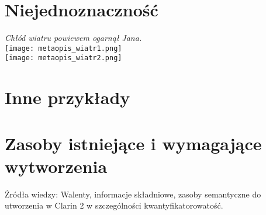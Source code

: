 \documentclass[a4paper,12pt]{article}
\begin{document}
\section{Niejednoznaczność}
\begin{center}
{\it Chłód wiatru powiewem ogarnął Jana.}\\
\texttt{[image: metaopis\_wiatr1.png]}\\
\texttt{[image: metaopis\_wiatr2.png]}
\end{center}

\section{Inne przykłady}


\section{Zasoby istniejące i wymagające wytworzenia}

Źródła wiedzy: Walenty, informacje składniowe, zasoby semantyczne do utworzenia w Clarin 2
w szczególności kwantyfikatorowatość.

\end{document}
